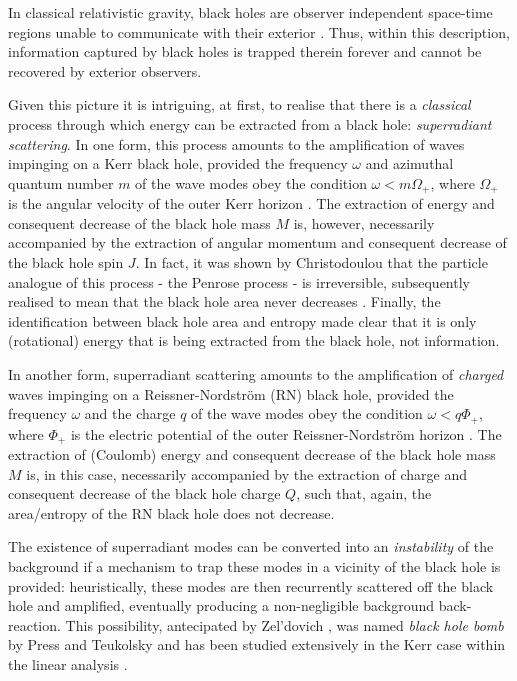 \documentclass[aps, prd, twocolumn, amsmath, floats,floatfix, superscriptaddress,
nofootinbib, showpacs]{revtex4-1}
\begin{document}
In classical relativistic gravity, black holes are observer independent space-time 
regions unable to communicate with their exterior \cite{Hawking:1973uf}. Thus, within this
description, information captured by black holes is trapped therein forever and cannot be
recovered by exterior observers. 
 
Given this picture it is intriguing, at first, to realise that there is a 
\textit{classical} process through which energy can be extracted from a black hole:
\textit{superradiant scattering}.  In one form, this process amounts to the amplification
of waves impinging on a Kerr black hole, provided the frequency $\omega$ and azimuthal
quantum number $m$ of the wave modes obey the condition $\omega<m\Omega_+$, where
$\Omega_+$ is the angular velocity of the outer Kerr horizon
\cite{Bardeen:1972fi,Starobinsky:1973a,Press:1972zz}. The extraction of energy and
consequent decrease of the black hole mass $M$ is, however, necessarily accompanied by the
extraction of angular momentum and consequent decrease of the  black hole spin $J$. In
fact, it was shown by Christodoulou \cite{Christodoulou:1970wf} that the particle analogue
of this  process - the Penrose process \cite{Penrose:1969pc} - is irreversible,
subsequently realised to mean that the black hole area never decreases
\cite{Christodoulou:1972kt}. Finally, the identification between black hole area and
entropy \cite{Bekenstein:1973ur,Bardeen:1973gs} made clear that it is only (rotational)
energy that is being extracted from the black hole, not information.  
  
In another form, superradiant scattering amounts to the amplification of \textit{charged} 
waves impinging on a Reissner-Nordstr\"om (RN) black hole, provided the frequency $\omega$
and the charge $q$ of the wave modes obey the condition $\omega<q\Phi_+$, where $\Phi_+$
is the electric potential of the outer Reissner-Nordstr\"om horizon
\cite{Bekenstein:1973mi}. The extraction of (Coulomb) energy and consequent decrease of
the black hole mass $M$ is, in this case, necessarily accompanied by the extraction of
charge and consequent decrease of the  black hole charge $Q$, such that, again, the
area/entropy of the RN black hole does not decrease.

The existence of superradiant modes can be converted into an \textit{instability} of the 
background if a mechanism to trap these modes in a vicinity of the black hole is provided:
heuristically, these modes are then recurrently scattered off the black hole and
amplified, eventually producing a non-negligible background back-reaction. This
possibility, antecipated by Zel'dovich \cite{Zeldovich:1971}, was named \textit{black hole
bomb} by Press and Teukolsky \cite{Press:1972zz} and has been studied extensively in the
Kerr case within the linear analysis
\cite{Cardoso:2004nk,Hod:2009cp,Rosa:2009ei,Pani:2012vp}. 
\end{document}
